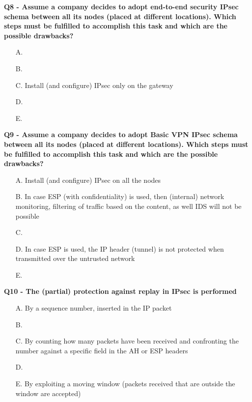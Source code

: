 \textbf{Q8 - Assume a company decides to adopt end-to-end security IPsec schema between all its nodes (placed at different locations). 
Which steps must be fulfilled to accomplish this task and which are the possible drawbacks?}
\begin{itemize}
    \item[A.] 
    \item[B.] 
    \item[C.] Install (and configure) IPsec only on the gateway
    \item[D.] 
    \item[E.] 
\end{itemize}

\textbf{Q9 - Assume a company decides to adopt Basic VPN IPsec schema between all its nodes (placed at different locations). 
Which steps must be fulfilled to accomplish this task and which are the possible drawbacks?}
\begin{itemize}
    \item[A.] Install (and configure) IPsec on all the nodes
    \item[B.] In case ESP (with confidentiality) is used, then (internal) network monitoring, filtering of traffic based on the content, as well IDS will not be possible
    \item[C.] 
    \item[D.] In case ESP is used, the IP header (tunnel) is not protected when transmitted over the untrusted network
    \item[E.] 
\end{itemize}

\textbf{Q10 - The (partial) protection against replay in IPsec is performed}
\begin{itemize}
    \item[A.] By a sequence number, inserted in the IP packet
    \item[B.] 
    \item[C.] By counting how many packets have been received and confronting the number against a specific field in the AH or ESP headers
    \item[D.] 
    \item[E.] By exploiting a moving window (packets received that are outside the window are accepted)
\end{itemize}

